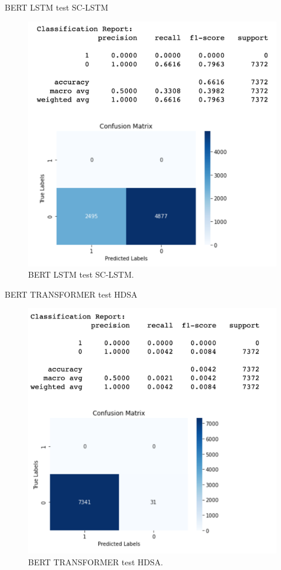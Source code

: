 \documentclass[11pt]{article}
\begin{document}
BERT LSTM test SC-LSTM
\begin{figure}[H]
    \centering
       \includegraphics[scale=.6]{figures/SC-LSTM in LSTM BERT.png}
   \caption{BERT LSTM test SC-LSTM.}
   \label{fig:5}
\end{figure}
\newpage
 

BERT TRANSFORMER test HDSA
\begin{figure}[H]
    \centering
       \includegraphics[scale=.6]{figures/HDSA in TRANSFOMERS.png}
   \caption{BERT TRANSFORMER test HDSA.}
   \label{fig:5}
\end{figure}
\newpage
 
\end{document}
